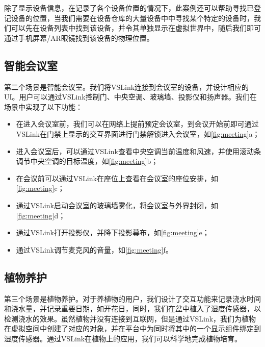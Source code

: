 除了显示设备信息，在记录了各个设备位置的情况下，此案例还可以帮助寻找已登记设备的位置，当我们需要在设备仓库的大量设备中中寻找某个特定的设备时，我们可以先在设备列表中找到该设备，并令其单独显示在虚拟世界中，随后我们即可通过手机屏幕/AR眼镜找到该设备的物理位置。
\subsection{智能会议室}
第二个场景是智能会议室。我们将VSLink连接到会议室的设备，并设计相应的UI。用户可以通过VSLink控制门、中央空调、玻璃墙、投影仪和扬声器。我们在场景中实现了以下功能：
\begin{itemize}
	\item 在进入会议室前，我们可以在网络上提前预定会议室，到会议开始前即可通过VSLink在门禁上显示的交互界面进行门禁解锁进入会议室，如\autoref{fig:meeting}a；
	\item 进入会议室后，可以通过VSLink查看中央空调当前温度和风速，并使用滚动条调节中央空调的目标温度，如\autoref{fig:meeting}b；
	\item 在会议前可以通过VSLink在座位上查看在会议室的座位安排，如\autoref{fig:meeting}c；
	\item 通过VSLink启动会议室的玻璃墙雾化，将会议室与外界封闭，如\autoref{fig:meeting}d；
	\item 通过VSLink打开投影仪，并降下投影幕布，如\autoref{fig:meeting}e；
	\item 通过VSLink调节麦克风的音量，如\autoref{fig:meeting}f。
\end{itemize}
\subsection{植物养护}
第三个场景是植物养护。对于养植物的用户，我们设计了交互功能来记录浇水时间和浇水量，并记录重要日期，如开花日，同时，我们在盆中植入了湿度传感器，以检测浇水的效果。虽然植物并没有连接到互联网，但是通过VSLink，我们为植物在虚拟空间中创建了对应的对象，并在平台中为同时将其中的一个显示组件绑定到湿度传感器。通过VSLink在植物上的应用，我们可以科学地完成植物培育。

